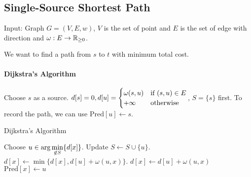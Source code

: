 
\subsection{Single-Source Shortest Path}
\begin{example}
    Input: Graph $ G=(V,E,w) $,  $ V $ is the set of point and  $ E $ is the set of edge with direction  and  $ \omega:E\rightarrow \mathbb R_{ \geq 0} $.
    
    We want to find a path from  $ s $ to  $ t $ with minimum total cost.
\end{example}
\paragraph{Dijkstra's Algorithm}
Choose  $ s  $ as a source.  $ d[s]=0,d[u]=\begin{cases}
    \omega(s,u)&\text{if  $ (s,u)\in E $}\\
    +\infty &\text{otherwise}
\end{cases} $, $ S=\{s\} $ first. To record the path, we can use  $ \mathrm{Pred}[u]\leftarrow s $.  

\begin{algorithm}
    \caption{Dijkstra's Algorithm}
    \label{alg:dijkstra}
    \begin{algorithmic}[1]
        \STATE Choose  $ u\in \displaystyle\arg\min_{\not\in S}\{d[x]\} $.\label{Choose u min}
        \STATE Update  $ S\leftarrow S\cup\{u\} $.
            \STATE$ d[x]\leftarrow\min\{d[x],d[u]+\omega(u,x)\} $.
                \STATE  $ d[x]\leftarrow d[u]+\omega(u,x) $  
                \STATE  $ \mathrm{Pred}[x]\leftarrow u $  
            \ENDIF
        \ENDFOR 
    \ENDWHILE
    \end{algorithmic}
\end{algorithm}

